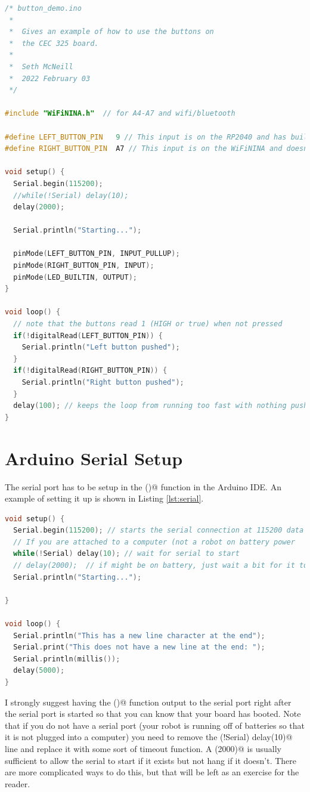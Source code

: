\begin{lstlisting}[language=C++, caption={This is an example of how to setup the buttons on the CEC 325 board.},label={lst:buttons}]
/* button_demo.ino
 *  
 *  Gives an example of how to use the buttons on 
 *  the CEC 325 board.
 *  
 *  Seth McNeill
 *  2022 February 03
 */

#include "WiFiNINA.h"  // for A4-A7 and wifi/bluetooth

#define LEFT_BUTTON_PIN   9 // This input is on the RP2040 and has builtin pullup that works
#define RIGHT_BUTTON_PIN  A7 // This input is on the WiFiNINA and doesn't have working internal pullup

void setup() {
  Serial.begin(115200);
  //while(!Serial) delay(10);
  delay(2000);

  Serial.println("Starting...");

  pinMode(LEFT_BUTTON_PIN, INPUT_PULLUP);
  pinMode(RIGHT_BUTTON_PIN, INPUT);
  pinMode(LED_BUILTIN, OUTPUT);
}

void loop() {
  // note that the buttons read 1 (HIGH or true) when not pressed
  if(!digitalRead(LEFT_BUTTON_PIN)) {
    Serial.println("Left button pushed");
  }
  if(!digitalRead(RIGHT_BUTTON_PIN)) {
    Serial.println("Right button pushed");
  }
  delay(100); // keeps the loop from running too fast with nothing pushed
}
\end{lstlisting}

\section{Arduino Serial Setup}
The serial port has to be setup in the \lstinline@setup()@ function in the Arduino IDE. An example of setting it up 
is shown in Listing \ref{lst:serial}.

\begin{lstlisting}[language=C++, caption={This is an example of how to start the serial port at 112,500 in the Arduino system.},label={lst:serial}]
void setup() {
  Serial.begin(115200); // starts the serial connection at 115200 data (baud) rate
  // If you are attached to a computer (not a robot on battery power
  while(!Serial) delay(10); // wait for serial to start
  // delay(2000);  // if might be on battery, just wait a bit for it to start
  Serial.println("Starting...");

}

void loop() {
  Serial.println("This has a new line character at the end");
  Serial.print("This does not have a new line at the end: ");
  Serial.println(millis());
  delay(5000);
}
\end{lstlisting}
I strongly suggest having the \lstinline@setup()@ function output to the serial port right after the serial port is started 
so that you can know that your board has booted. Note that if you do not have a serial port (your robot is running off of 
batteries so that it is not plugged into a computer) you need to remove the \lstinline@while(!Serial) delay(10)@ line and 
replace it with some sort of timeout function. A \lstinline@delay(2000)@ is usually sufficient to allow the serial to start 
if it exists but not hang if it doesn't. There are more complicated ways to do this, but that will be left as an exercise 
for the reader.



